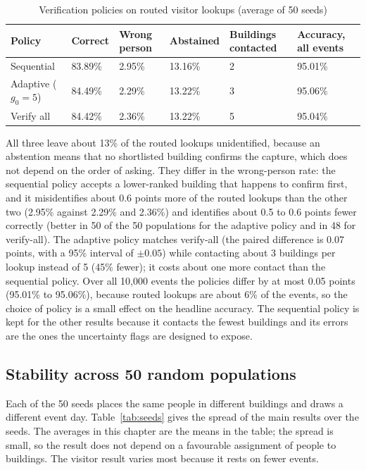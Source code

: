 \documentclass[12pt,a4paper,oneside]{report}
\begin{document}
\begin{table}[htbp]
\centering
\caption{Verification policies on routed visitor lookups (average of 50 seeds)}\label{tab:policies}
{\small\setlength{\tabcolsep}{4pt}\renewcommand{\arraystretch}{1.2}
\begin{tabular}{|p{3.0cm}|p{1.9cm}|p{2.2cm}|p{2.0cm}|p{2.3cm}|p{2.2cm}|}\hline
\textbf{Policy} & \textbf{Correct} & \textbf{Wrong person} & \textbf{Abstained} & \textbf{Buildings contacted} & \textbf{Accuracy, all events}\\\hline
Sequential & 83.89\% & 2.95\% & 13.16\% & 2 & 95.01\%\\\hline
Adaptive ($g_0=5$) & 84.49\% & 2.29\% & 13.22\% & 3 & 95.06\%\\\hline
Verify all & 84.42\% & 2.36\% & 13.22\% & 5 & 95.04\%\\\hline
\end{tabular}}
\end{table}

All three leave about 13\% of the routed lookups unidentified, because an abstention means that no shortlisted building confirms the capture, which does not depend on the order of asking. They differ in the wrong-person rate: the sequential policy accepts a lower-ranked building that happens to confirm first, and it misidentifies about 0.6 points more of the routed lookups than the other two (2.95\% against 2.29\% and 2.36\%) and identifies about 0.5 to 0.6 points fewer correctly (better in 50 of the 50 populations for the adaptive policy and in 48 for verify-all). The adaptive policy matches verify-all (the paired difference is 0.07 points, with a 95\% interval of $\pm0.05$) while contacting about 3 buildings per lookup instead of 5 (45\% fewer); it costs about one more contact than the sequential policy. Over all 10,000 events the policies differ by at most 0.05 points (95.01\% to 95.06\%), because routed lookups are about 6\% of the events, so the choice of policy is a small effect on the headline accuracy. The sequential policy is kept for the other results because it contacts the fewest buildings and its errors are the ones the uncertainty flags are designed to expose.

\subsection{Stability across 50 random populations}\label{sec:res-seeds}
Each of the 50 seeds places the same people in different buildings and draws a different event day. Table~\ref{tab:seeds} gives the spread of the main results over the seeds. The averages in this chapter are the means in the table; the spread is small, so the result does not depend on a favourable assignment of people to buildings. The visitor result varies most because it rests on fewer events.
\end{document}
